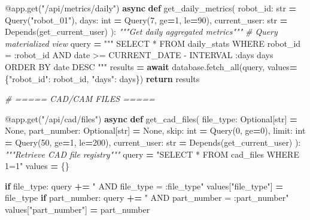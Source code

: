 \documentclass[
]{article}
\newenvironment{Shaded}{\begin{snugshade}}{\end{snugshade}}
\newcommand{\AttributeTok}[1]{\textcolor[rgb]{0.13,0.29,0.53}{#1}}
\newcommand{\BuiltInTok}[1]{#1}
\newcommand{\CommentTok}[1]{\textcolor[rgb]{0.56,0.35,0.01}{\textit{#1}}}
\newcommand{\ControlFlowTok}[1]{\textcolor[rgb]{0.13,0.29,0.53}{\textbf{#1}}}
\newcommand{\DecValTok}[1]{\textcolor[rgb]{0.00,0.00,0.81}{#1}}
\newcommand{\KeywordTok}[1]{\textcolor[rgb]{0.13,0.29,0.53}{\textbf{#1}}}
\newcommand{\NormalTok}[1]{#1}
\newcommand{\OperatorTok}[1]{\textcolor[rgb]{0.81,0.36,0.00}{\textbf{#1}}}
\newcommand{\StringTok}[1]{\textcolor[rgb]{0.31,0.60,0.02}{#1}}
\newcommand{\VariableTok}[1]{\textcolor[rgb]{0.00,0.00,0.00}{#1}}
\begin{document}
\begin{Shaded}
\begin{Highlighting}[]
\AttributeTok{@app.get}\NormalTok{(}\StringTok{"/api/metrics/daily"}\NormalTok{)}
\ControlFlowTok{async} \KeywordTok{def}\NormalTok{ get\_daily\_metrics(}
\NormalTok{    robot\_id: }\BuiltInTok{str} \OperatorTok{=}\NormalTok{ Query(}\StringTok{"robot\_01"}\NormalTok{),}
\NormalTok{    days: }\BuiltInTok{int} \OperatorTok{=}\NormalTok{ Query(}\DecValTok{7}\NormalTok{, ge}\OperatorTok{=}\DecValTok{1}\NormalTok{, le}\OperatorTok{=}\DecValTok{90}\NormalTok{),}
\NormalTok{    current\_user: }\BuiltInTok{str} \OperatorTok{=}\NormalTok{ Depends(get\_current\_user)}
\NormalTok{):}
    \CommentTok{"""Get daily aggregated metrics"""}
    \CommentTok{\# Query materialized view}
\NormalTok{    query }\OperatorTok{=} \StringTok{"""}
\StringTok{        SELECT * FROM daily\_stats}
\StringTok{        WHERE robot\_id = :robot\_id}
\StringTok{        AND date \textgreater{}= CURRENT\_DATE {-} INTERVAL \textquotesingle{}:days days\textquotesingle{}}
\StringTok{        ORDER BY date DESC}
\StringTok{    """}
\NormalTok{    results }\OperatorTok{=} \ControlFlowTok{await}\NormalTok{ database.fetch\_all(query, values}\OperatorTok{=}\NormalTok{\{}\StringTok{"robot\_id"}\NormalTok{: robot\_id, }\StringTok{"days"}\NormalTok{: days\})}
    \ControlFlowTok{return}\NormalTok{ results}

\CommentTok{\# ===== CAD/CAM FILES =====}

\AttributeTok{@app.get}\NormalTok{(}\StringTok{"/api/cad/files"}\NormalTok{)}
\ControlFlowTok{async} \KeywordTok{def}\NormalTok{ get\_cad\_files(}
\NormalTok{    file\_type: Optional[}\BuiltInTok{str}\NormalTok{] }\OperatorTok{=} \VariableTok{None}\NormalTok{,}
\NormalTok{    part\_number: Optional[}\BuiltInTok{str}\NormalTok{] }\OperatorTok{=} \VariableTok{None}\NormalTok{,}
\NormalTok{    skip: }\BuiltInTok{int} \OperatorTok{=}\NormalTok{ Query(}\DecValTok{0}\NormalTok{, ge}\OperatorTok{=}\DecValTok{0}\NormalTok{),}
\NormalTok{    limit: }\BuiltInTok{int} \OperatorTok{=}\NormalTok{ Query(}\DecValTok{50}\NormalTok{, ge}\OperatorTok{=}\DecValTok{1}\NormalTok{, le}\OperatorTok{=}\DecValTok{200}\NormalTok{),}
\NormalTok{    current\_user: }\BuiltInTok{str} \OperatorTok{=}\NormalTok{ Depends(get\_current\_user)}
\NormalTok{):}
    \CommentTok{"""Retrieve CAD file registry"""}
\NormalTok{    query }\OperatorTok{=} \StringTok{"SELECT * FROM cad\_files WHERE 1=1"}
\NormalTok{    values }\OperatorTok{=}\NormalTok{ \{\}}

    \ControlFlowTok{if}\NormalTok{ file\_type:}
\NormalTok{        query }\OperatorTok{+=} \StringTok{" AND file\_type = :file\_type"}
\NormalTok{        values[}\StringTok{"file\_type"}\NormalTok{] }\OperatorTok{=}\NormalTok{ file\_type}
    \ControlFlowTok{if}\NormalTok{ part\_number:}
\NormalTok{        query }\OperatorTok{+=} \StringTok{" AND part\_number = :part\_number"}
\NormalTok{        values[}\StringTok{"part\_number"}\NormalTok{] }\OperatorTok{=}\NormalTok{ part\_number}


\end{Highlighting}
\end{Shaded}
\end{document}
